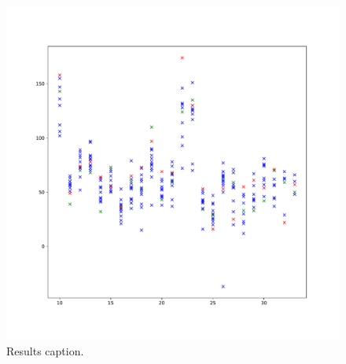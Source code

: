 \begin{figure}[h]
  \centering
  \includegraphics[width=1.0\textwidth]{images/final}
  \caption{Results caption.}
  \label{fig:final}
\end{figure}